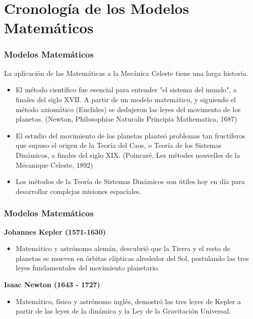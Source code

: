\section{Cronología de los Modelos Matemáticos}


\begin{frame}
\frametitle{Modelos Matemáticos}

La aplicación de las Matemáticas a la Mecánica Celeste tiene una larga historia.

\begin{itemize}[<+->]
\item El método científico fue esencial para entender "el sistema del
mundo", a finales del siglo XVII. A partir de un modelo
matemático, y siguiendo el método axiomático (Euclides) se
dedujeron las leyes del movimento de los planetas.
(\alert{Newton}, Philosophiae Naturalis Principia Mathematica, 1687)
\item El estudio del movimiento de los planetas planteó problemas tan
fructíferos que supuso el origen de la Teoría del Caos, o Teoría de
los Sistemas Dinámicos, a finales del siglo XIX.
(\alert{Poincaré}, Les métodes nouvelles de la Mécanique Celeste, 1892)
\item Los métodos de la Teoría de Sistemas Dinámicos son útiles hoy
en día para desarrollar complejas misiones espaciales.
\end{itemize}
\end{frame}





\begin{frame}
\frametitle{Modelos Matemáticos}

\textbf{Johannes Kepler (1571-1630)}

\begin{itemize}[<+->]

\item Matemático y astrónomo alemán, descubrió que la Tierra y el resto de planetas se mueven en órbitas elípticas alrededor del Sol, postulando las tres leyes fundamentales del movimiento planetario.

\end{itemize}

\textbf{Isaac Newton (1643 - 1727)}

\begin{itemize}[<+->]

\item Matemático, físico y astrónomo inglés, demostró las tres leyes de Kepler a partir de las leyes de la dinámica y la Ley de la Gravitación Universal.

\end{itemize}

\end{frame}






